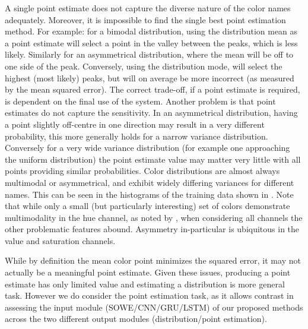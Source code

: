 \documentclass[]{clv3}
\newcommand{\textcite}{\citet}
\begin{document}
A single point estimate does not capture the diverse nature of the color names adequately. Moreover, it is impossible to find the single best point estimation method.
For example: for a bimodal distribution, using the distribution mean as a point estimate will select a point in the valley between the peaks, which is less likely.
Similarly for an asymmetrical distribution, where the mean will be off to one side of the peak.
Conversely, using the distribution mode, will select the highest (most likely) peaks, but will on average be more incorrect (as measured by the mean squared error).
The correct trade-off, if a point estimate is required, is dependent on the final use of the system.
Another problem is that point estimates do not capture the sensitivity.
In an asymmetrical distribution, having a point slightly off-centre in one direction may result in a very different probability,
this more generally holds for a narrow variance distribution.
Conversely for a very wide variance distribution (for example one approaching the uniform distribution) the point estimate value may matter very little with all points providing similar probabilities.
Color distributions are almost always multimodal or asymmetrical, and exhibit widely differing variances for different names.
This can be seen in the histograms of the training data shown in .
Note that while only a small (but particularly interesting) set of colors demonstrate multimodality in the hue channel, as noted by \textcite{mcmahan2015bayesian}, when considering all channels the other problematic features  abound. Asymmetry in-particular is ubiquitous in the value and saturation channels.


While by definition the mean color point minimizes the squared error, it may not actually be a  meaningful point estimate.
Given these issues, producing a point estimate has only limited value and estimating a distribution is more general task.
However we do consider the point estimation task, as it allows contrast in assessing the input module (SOWE/CNN/GRU/LSTM) of our proposed methods across the two different output modules (distribution/point estimation).
\end{document}
